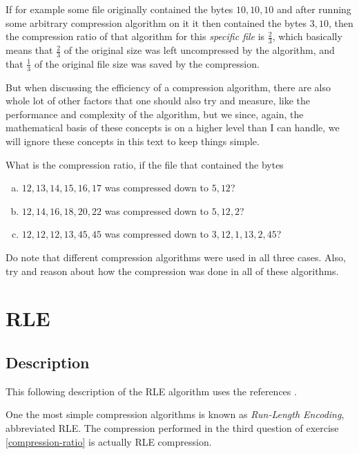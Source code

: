 If for example some file originally contained the bytes $10,10,10$ and
after running some arbitrary compression algorithm on it it then
contained the bytes $3,10$, then the compression ratio of that
algorithm for this \textit{specific file} is $\frac{2}{3}$, which
basically means that $\frac{2}{3}$ of the original size was left
uncompressed by the algorithm, and that $\frac{1}{3}$ of the original
file size was saved by the compression.

But when discussing the efficiency of a compression algorithm, there
are also whole lot of other factors that one should also try and
measure, like the performance and complexity of the algorithm, but we
since, again, the mathematical basis of these concepts is on a higher
level than I can handle, we will ignore these concepts in this
text to keep things simple.

\begin{Exercise}[label={compression-ratio}]
  What is the compression ratio, if the file that contained the bytes

  \begin{enumerate}[(a)]
  \item $12,13,14,15,16,17$ was compressed down to $5,12$?
  \item $12,14,16,18,20,22$ was compressed down to $5,12,2$?
  \item $12,12,12,13,45,45$ was compressed down to $3,12,1,13,2,45$?
  \end{enumerate}

  Do note that different compression algorithms were used in all three
  cases. Also, try and reason about how the compression was done in
  all of these algorithms.

\end{Exercise}

\section{RLE}
\label{sec:rle}

\subsection{Description}
\label{sec:description}

This following description of the RLE algorithm uses the references
\cite{nagarajan11:_enhan_approac_run_lengt_encod_schem,murray1996encyclopedia,mark1996data_compression_book}.

One the most simple compression algorithms is known as
\textit{Run-Length Encoding}, abbreviated
RLE. The compression performed in the third question of
exercise \ref{compression-ratio} is actually RLE compression.

